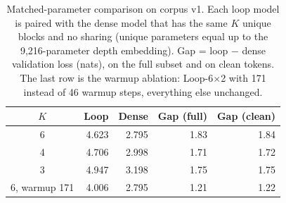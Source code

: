 \begin{table}[t]
\centering
\caption{Matched-parameter comparison on corpus v1. Each loop model is paired with the dense model that has the same $K$ unique blocks and no sharing (unique parameters equal up to the 9{,}216-parameter depth embedding). Gap = loop $-$ dense validation loss (nats), on the full subset and on clean tokens. The last row is the warmup ablation: Loop-6$\times$2 with 171 instead of 46 warmup steps, everything else unchanged.}
\label{tab:gaps}
\begin{tabular}{crrrr}
\toprule
$K$ & Loop & Dense & Gap (full) & Gap (clean) \\
\midrule
6 & 4.623 & 2.795 & 1.83 & 1.84 \\
4 & 4.706 & 2.998 & 1.71 & 1.72 \\
3 & 4.947 & 3.198 & 1.75 & 1.75 \\
\midrule
6, warmup 171 & 4.006 & 2.795 & 1.21 & 1.22 \\
\bottomrule
\end{tabular}
\end{table}
